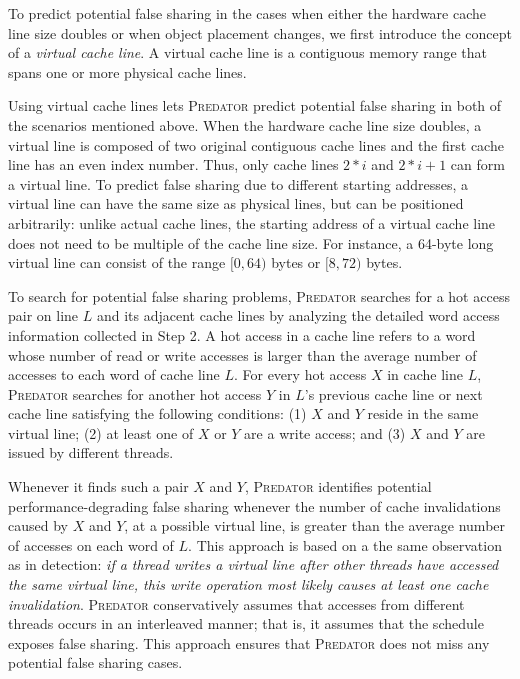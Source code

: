 \documentclass[10pt]{sigplanconf}
\newcommand{\Predator}{{\scshape Predator}}
\begin{document}
To predict potential false sharing in the cases when either the hardware cache line size doubles or when object placement changes, we first 
introduce the concept of a \emph{virtual cache line}.  A virtual cache line
is a contiguous memory range that spans one or more physical cache 
lines.

Using virtual cache lines lets \Predator{} predict potential false sharing in both of the scenarios mentioned above. When the hardware cache line size doubles, a virtual line is
composed of two original contiguous cache lines and the first cache
line has an even index number.  Thus, only cache lines $2*i$ and
$2*i+1$ can form a virtual line.  To predict false sharing due to different starting
addresses, a virtual line can have the same size as physical lines,
but can be positioned arbitrarily: unlike actual cache lines, the
starting address of a virtual cache line does not need to be multiple
of the cache line size.  For instance, a 64-byte long virtual line can
consist of the range $[0,64)$ bytes or $[8,72)$ bytes.

To search for potential false sharing problems, 
\Predator{} searches for a hot access pair on line $L$ and its adjacent cache lines 
by analyzing the detailed word access information collected in Step 2. 
A hot access in a cache line refers to a word whose number of read or write accesses 
is larger than the average number of accesses to each word of cache line $L$.
For every hot access $X$ in cache line $L$, \Predator{} searches for another
hot access $Y$ in $L$'s previous cache line or next cache line satisfying
the following conditions: 
(1) $X$ and $Y$ reside in the same virtual line;
(2) at least one of $X$ or $Y$ are a write access; and 
(3) $X$ and $Y$ are issued by different threads.


Whenever it finds such a pair $X$ and $Y$, 
\Predator{} identifies potential performance-degrading false sharing whenever
the number of cache invalidations caused by $X$ and $Y$, at a possible virtual line, 
is greater than the average number of accesses on each word of $L$. 
This approach is based on a the same observation as in detection:
\emph{if a thread writes a virtual line after other threads 
have accessed the same virtual line, this write operation most likely causes at least one cache 
invalidation}. 
\Predator{} conservatively assumes that accesses from different threads occurs in an interleaved manner; that is, it assumes that the schedule exposes false sharing.
This approach ensures that \Predator{} does not miss any potential false sharing cases.
\end{document}
